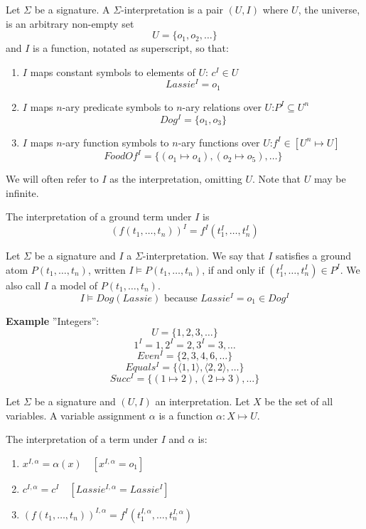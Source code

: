 \documentclass[10pt, letterpaper]{report}
\begin{document}
 \begin{definition}[Interpretation]
    Let $\Sigma$ be a signature. A $\Sigma$-interpretation is a pair $(U, I)$ where $U$, the universe, is an arbitrary non-empty set $$U = \{o_1, o_2, \dots\}$$ and $I$ is a function, notated as superscript, so that:\begin{enumerate}


    \item$I$ maps constant symbols to elements of $U$: $c^I \in U $ $$ Lassie^I = o_1$$
    \item$I$ maps $n$-ary predicate symbols to $n$-ary relations over $U$:$P^I \subseteq U^n $ $$ Dog^I = \{o_1, o_3\}$$
    \item$I$ maps $n$-ary function symbols to $n$-ary functions over $U$:$f^I \in [U^n \mapsto U]$ $$FoodOf^I = \{(o_1 \mapsto o_4), (o_2 \mapsto o_5), \dots\}$$\end{enumerate} 
    
    We will often refer to $I$ as the interpretation, omitting $U$. Note that $U$ may be infinite.
 \end{definition}
 \begin{definition}
    The interpretation of a ground term under $I$ is $$(f(t_1, \dots, t_n))^I = f^I(t_1^I, \dots, t_n^I)$$
 \end{definition}
 \begin{definition}
    Let $\Sigma$ be a signature and $I$ a $\Sigma$-interpretation. We say that $I$ satisfies a ground atom $P(t_1, \dots, t_n)$, written $I \models P(t_1, \dots, t_n)$, if and only if $(t_1^I, \dots, t_n^I) \in P^I$. We also call $I$ a model of $P(t_1, \dots, t_n)$.
$$ 
I \models Dog(Lassie) \text{ because } Lassie^I = o_1 \in Dog^I
$$
 \end{definition}
 \textbf{Example} ''Integers'': $$U = \{1, 2, 3, \dots\}$$ $$1^I = 1, 2^I = 2, 3^I = 3, \dots$$$$Even^I = \{2, 3, 4, 6, \dots\}$$ $$Equals^I = \{\langle 1, 1 \rangle, \langle 2, 2 \rangle, \dots\}$$ $$Succ^I = \{(1 \mapsto 2), (2 \mapsto 3), \dots\}$$
 \begin{definition}
    Let $\Sigma$ be a signature and $(U,I)$ an interpretation. Let $X$ be the set of all variables. A variable assignment $\alpha$ is a
 function $\alpha : X\mapsto U$. 
 \end{definition}
\begin{definition}
The interpretation of a term under $I$ and $\alpha$ is:
\begin{enumerate}
    \item $x^{I,\alpha} = \alpha(x) \quad [x^{I,\alpha} = o_1]$
    \item $c^{I,\alpha} = c^I \quad [Lassie^{I,\alpha} = Lassie^I]$
    \item $(f(t_1, \dots, t_n))^{I,\alpha} = f^I(t_1^{I,\alpha}, \dots, t_n^{I,\alpha})$ 
\end{enumerate}
\end{definition}
\end{document}

